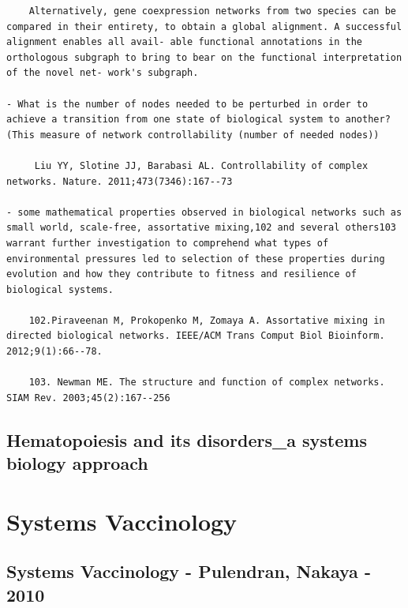 \documentclass[
]{book}
\begin{document}
\begin{verbatim}
    Alternatively, gene coexpression networks from two species can be compared in their entirety, to obtain a global alignment. A successful alignment enables all avail- able functional annotations in the orthologous subgraph to bring to bear on the functional interpretation of the novel net- work's subgraph.

- What is the number of nodes needed to be perturbed in order to achieve a transition from one state of biological system to another? (This measure of network controllability (number of needed nodes))

     Liu YY, Slotine JJ, Barabasi AL. Controllability of complex networks. Nature. 2011;473(7346):167--73

- some mathematical properties observed in biological networks such as small world, scale-free, assortative mixing,102 and several others103 warrant further investigation to comprehend what types of environmental pressures led to selection of these properties during evolution and how they contribute to fitness and resilience of biological systems.

    102.Piraveenan M, Prokopenko M, Zomaya A. Assortative mixing in directed biological networks. IEEE/ACM Trans Comput Biol Bioinform. 2012;9(1):66--78.

    103. Newman ME. The structure and function of complex networks. SIAM Rev. 2003;45(2):167--256
\end{verbatim}

\hypertarget{hematopoiesis-and-its-disorders_a-systems-biology-approach}{%
\subsection{Hematopoiesis and its disorders\_a systems biology approach}\label{hematopoiesis-and-its-disorders_a-systems-biology-approach}}

\hypertarget{systems-vaccinology-1}{%
\section{Systems Vaccinology}\label{systems-vaccinology-1}}

\hypertarget{systems-vaccinology---pulendran-nakaya---2010}{%
\subsection{Systems Vaccinology - Pulendran, Nakaya - 2010}\label{systems-vaccinology---pulendran-nakaya---2010}}
\end{document}

